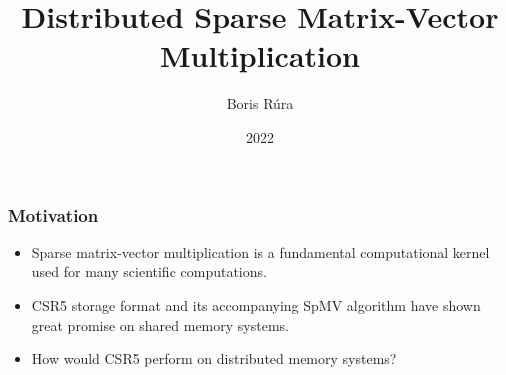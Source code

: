 \documentclass{beamer}
\title[Distributed SpMV]{Distributed Sparse Matrix-Vector Multiplication}
\author{Boris Rúra}
\institute[CTU FIT]{CTU Faculty of Information Technology}
\date{2022}
\newcommand{\csre}[1]{\texttt!#1!}
\begin{document}
\frame{\titlepage}

\begin{frame}
    \frametitle{Motivation}
    \begin{itemize}
        \item Sparse matrix-vector multiplication is a fundamental computational kernel used for many
              scientific computations.
        \item CSR5 storage format and its accompanying SpMV algorithm have shown great promise on shared memory systems.
        \item How would CSR5 perform on distributed memory systems?
    \end{itemize}
\end{frame}







\end{document}
